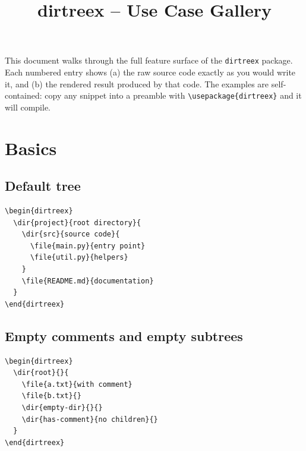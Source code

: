 \documentclass[11pt]{article}
\title{\textbf{dirtreex} -- Use Case Gallery}
\author{}
\date{}
\begin{document}
\maketitle

\noindent
This document walks through the full feature surface of the \texttt{dirtreex} package. Each numbered entry shows (a) the raw source code exactly as you would write it, and (b) the rendered result produced by that code. The examples are self-contained: copy any snippet into a preamble with \verb|\usepackage{dirtreex}| and it will compile.

\tableofcontents

\clearpage

\section{Basics}

\subsection{Default tree}

\begin{Verbatim}
\begin{dirtreex}
  \dir{project}{root directory}{
    \dir{src}{source code}{
      \file{main.py}{entry point}
      \file{util.py}{helpers}
    }
    \file{README.md}{documentation}
  }
\end{dirtreex}
\end{Verbatim}

\begin{dirtreex}
\end{dirtreex}

\subsection{Empty comments and empty subtrees}

\begin{Verbatim}
\begin{dirtreex}
  \dir{root}{}{
    \file{a.txt}{with comment}
    \file{b.txt}{}
    \dir{empty-dir}{}{}
    \dir{has-comment}{no children}{}
  }
\end{dirtreex}
\end{Verbatim}
\end{document}
